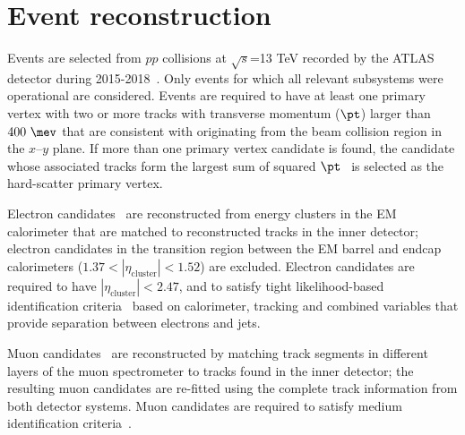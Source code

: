 \section{Event reconstruction}
\label{sec:objects}

Events are selected from $pp$ collisions at $\sqrt{s}$=13 TeV recorded by the ATLAS detector during 2015-2018~\cite{DAPR-2018-01}.
Only events for which all relevant subsystems were operational are considered.
Events are required to have at least one primary vertex with two or more tracks with transverse momentum
($\pt$) larger than $400~\mev$ that are consistent with originating from the 
beam collision region in the $x$--$y$ plane. If more than one primary vertex candidate is found, the
candidate whose associated tracks form the largest sum of squared $\pt$~\cite{ATL-PHYS-PUB-2015-026}
is selected as the hard-scatter primary vertex.

Electron candidates~\cite{EGAM-2018-01} are reconstructed from energy 
clusters in the EM calorimeter that are matched to reconstructed tracks in the inner detector;
electron candidates in the transition region between the EM barrel and endcap calorimeters 
($1.37 < |\eta_{\textrm{cluster}}| < 1.52$) are excluded.
Electron candidates are required to have $|\eta_{\textrm{cluster}}| < 2.47$, and to satisfy tight likelihood-based identification 
criteria~\cite{ATLAS-CONF-2016-024} based on calorimeter, tracking and combined variables that provide 
separation between electrons and jets. 

Muon candidates~\cite{MUON-2018-03} are reconstructed by matching track segments in %
different layers of the muon spectrometer to tracks found in the inner detector;
the resulting muon candidates are re-fitted using the complete track information from both detector systems.
Muon candidates are required to satisfy medium identification criteria~\cite{Aad:2016jkr}. 

